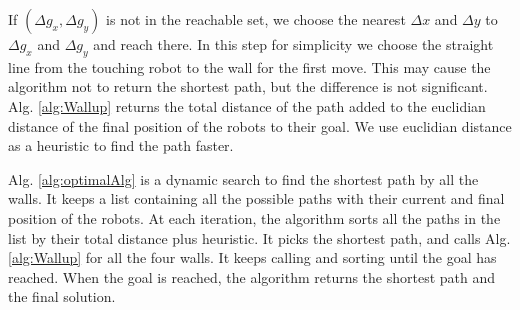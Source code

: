 If  $(\Delta g_x, \Delta g_y)$ is not in the reachable set, we choose the nearest $\Delta x$ and $\Delta y$ to $\Delta g_x$ and $\Delta g_y$ and reach there. In this step for simplicity we choose the straight line from the touching robot to the wall for the first move. This may cause the algorithm not to return the shortest path, but the difference is not significant. 
Alg. \ref{alg:Wallup} returns the total distance of the path added to the euclidian distance of the final position of the robots to their goal. We use euclidian distance as a heuristic to find the path faster.

Alg. \ref{alg:optimalAlg} is a dynamic search to find the shortest path by all the walls. It keeps a list containing all the possible paths with their current and final position of the robots. At each iteration, the algorithm sorts all the paths in the list by their total distance plus heuristic. It picks the shortest path, and calls Alg. \ref{alg:Wallup} for all the four walls. It keeps calling and sorting until the goal has reached. When the goal is reached, the algorithm returns the shortest path and the final solution.
%
%
%
%

